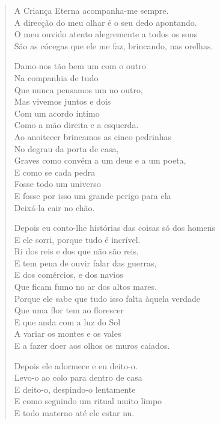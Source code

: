 \begin{verse}
A Criança Eterna acompanha-me sempre. \\
A direcção do meu olhar é o seu dedo apontando. \\
O meu ouvido atento alegremente a todos os sons \\
São as cócegas que ele me faz, brincando, nas orelhas.

Damo-nos tão bem um com o outro \\
Na companhia de tudo \\
Que nunca pensamos um no outro, \\
Mas vivemos juntos e dois \\
Com um acordo íntimo \\
Como a mão direita e a esquerda. \\

Ao anoitecer brincamos as cinco pedrinhas \\
No degrau da porta de casa, \\
Graves como convém a um deus e a um poeta, \\
E como se cada pedra \\
Fosse todo um universo \\
E fosse por isso um grande perigo para ela \\
Deixá-la cair no chão.

Depois eu conto-lhe histórias das coisas só dos homens \\
E ele sorri, porque tudo é incrível. \\
Ri dos reis e dos que não são reis, \\
E tem pena de ouvir falar das guerras, \\
E dos comércios, e dos navios \\
Que ficam fumo no ar dos altos mares. \\
Porque ele sabe que tudo isso falta àquela verdade \\
Que uma flor tem ao florescer \\
E que anda com a luz do Sol \\
A variar os montes e os vales \\
E a fazer doer aos olhos os muros caiados.

Depois ele adormece e eu deito-o. \\
Levo-o ao colo para dentro de casa \\
E deito-o, despindo-o lentamente \\
E como seguindo um ritual muito limpo \\
E todo materno até ele estar nu.


\end{verse}
